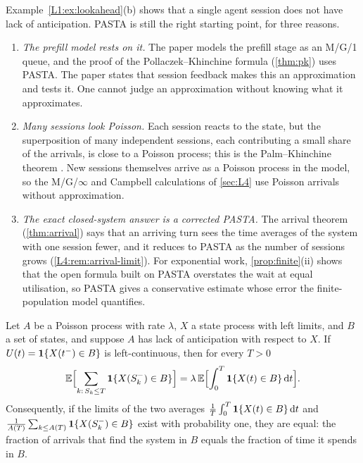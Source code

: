 \begin{remark}\label{L1:rem:why-pasta}
Example~\ref{L1:ex:lookahead}(b) shows that a single agent session does not have lack
of anticipation. PASTA is still the right starting point, for three reasons.
\begin{enumerate}
\item \emph{The prefill model rests on it.} The paper models the prefill stage as an
  M/G/1 queue, and the proof of the Pollaczek--Khinchine formula (\cref{thm:pk}) uses
  PASTA. The paper states that session feedback makes this an approximation and tests
  it. One cannot judge an approximation without knowing what it approximates.
\item \emph{Many sessions look Poisson.} Each session reacts to the state, but the
  superposition of many independent sessions, each contributing a small share of the
  arrivals, is close to a Poisson process; this is the Palm--Khinchine theorem
  \cite{khinchine1960}. New sessions themselves arrive as a Poisson process in the
  model, so the M/G/$\infty$ and Campbell calculations of \cref{sec:L4} use Poisson
  arrivals without approximation.
\item \emph{The exact closed-system answer is a corrected PASTA.} The arrival theorem
  (\cref{thm:arrival}) says that an arriving turn sees the time averages of the system
  with one session fewer, and it reduces to PASTA as the number of sessions grows
  (\cref{L4:rem:arrival-limit}). For exponential work, \cref{prop:finite}(ii) shows
  that the open formula built on PASTA overstates the wait at equal utilisation, so
  PASTA gives a conservative estimate whose error the finite-population model
  quantifies.
\end{enumerate}
\end{remark}

\begin{theorem}\label{thm:pasta}
Let $A$ be a Poisson process with rate $\lambda$, $X$ a state process with left
limits, and $B$ a set of states, and suppose $A$ has lack of anticipation with respect
to $X$. If $U(t)=\mathbf{1}\{X(t^-)\in B\}$ is left-continuous, then for every $T>0$
\begin{equation}\label{L1:eq:pasta}
  \mathbb{E}\Bigl[\sum_{k:\,S_k\le T}\mathbf{1}\{X(S_k^-)\in B\}\Bigr]=\lambda\,\mathbb{E}\Bigl[\int_0^T\mathbf{1}\{X(t)\in B\}\,\mathrm{d} t\Bigr].
\end{equation}
Consequently, if the limits of the two averages
$\frac1T\int_0^T\mathbf{1}\{X(t)\in B\}\,\mathrm{d} t$ and
$\frac{1}{A(T)}\sum_{k\le A(T)}\mathbf{1}\{X(S_k^-)\in B\}$ exist with probability one, they
are equal: the fraction of arrivals that find the system in $B$ equals the fraction of
time it spends in $B$.
\end{theorem}


